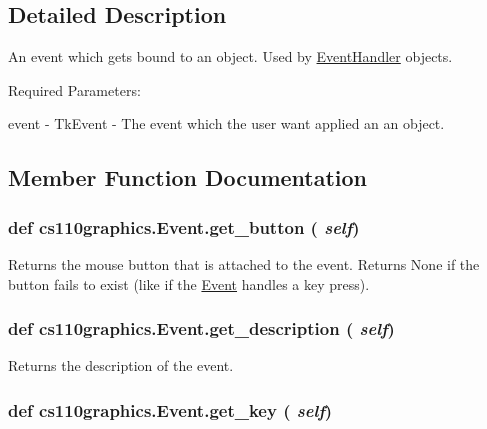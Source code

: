 \subsection{Detailed Description}
An event which gets bound to an object. Used by \hyperlink{classcs110graphics_1_1EventHandler}{EventHandler} objects.

Required Parameters:
\begin{DoxyItemize}
\item event -\/ TkEvent -\/ The event which the user want applied an an object. 
\end{DoxyItemize}

\subsection{Member Function Documentation}
\hypertarget{classcs110graphics_1_1Event_abdb7a2999936cc7ab1119289f05f8243}{
\subsubsection[{get\_\-button}]{\setlength{\rightskip}{0pt plus 5cm}def cs110graphics.Event.get\_\-button ( {\em self})}}
\label{classcs110graphics_1_1Event_abdb7a2999936cc7ab1119289f05f8243}


Returns the mouse button that is attached to the event. Returns None if the button fails to exist (like if the \hyperlink{classcs110graphics_1_1Event}{Event} handles a key press). \hypertarget{classcs110graphics_1_1Event_a7bd201ecbf74db6d78dbf2fb4f622a7c}{
\subsubsection[{get\_\-description}]{\setlength{\rightskip}{0pt plus 5cm}def cs110graphics.Event.get\_\-description ( {\em self})}}
\label{classcs110graphics_1_1Event_a7bd201ecbf74db6d78dbf2fb4f622a7c}


Returns the description of the event. \hypertarget{classcs110graphics_1_1Event_a0d795ddaef92049cee1d7b09898cf225}{
\subsubsection[{get\_\-key}]{\setlength{\rightskip}{0pt plus 5cm}def cs110graphics.Event.get\_\-key ( {\em self})}}
\label{classcs110graphics_1_1Event_a0d795ddaef92049cee1d7b09898cf225}


